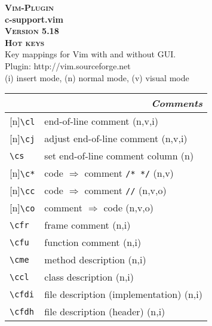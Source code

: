 \documentclass[oneside,11pt,landscape,DIV17]{scrartcl}
\newcommand{\Pluginversion}{5.18}
\newcommand{\Rep}{{\tiny{[n]}}}
\begin{document}
%

\begin{multicols}{3}
%
\begin{center}
\textbf{\textsc{\small{Vim-Plugin}}}\\
\textbf{\LARGE{c-support.vim}}\\
\textbf{\textsc{\small{Version \Pluginversion}}}\\
\textbf{\textsc{\Huge{Hot keys}}}\\
Key mappings for Vim with and without GUI.\\
Plugin: http://vim.sourceforge.net\\
\vspace{3.0mm}
{\normalsize (i)} insert mode, {\normalsize (n)} normal mode, {\normalsize (v)} visual mode\\
\vspace{5.0mm}
%
\begin{tabular}[]{|p{10mm}|p{60mm}|}
%
\hline
\multicolumn{2}{|r|}{\textsl{\textbf{C}omments}} \\
\hline \Rep\verb'\cl'  & end-of-line comment                     \hfill (n,v,i)\\
\hline \Rep\verb'\cj'  & adjust end-of-line comment              \hfill (n,v,i)\\
\hline     \verb'\cs'  & set end-of-line comment column          \hfill (n)    \\
\hline \Rep\verb'\c*'  & code $\Rightarrow$ comment \verb'/* */' \hfill (n,v)  \\
\hline \Rep\verb'\cc'  & code $\Rightarrow$ comment \verb'//'    \hfill (n,v,o)\\
\hline \Rep\verb'\co'  & comment $\Rightarrow$ code              \hfill (n,v,o)\\

\hline \verb'\cfr' & frame comment                           \hfill (n,i)\\
\hline \verb'\cfu' & function comment                        \hfill (n,i)\\
\hline \verb'\cme' & method description                      \hfill (n,i)\\
\hline \verb'\ccl' & class description                       \hfill (n,i)\\
\hline \verb'\cfdi'& file description (implementation)       \hfill (n,i)\\
\hline \verb'\cfdh'& file description (header)               \hfill (n,i)\\


\end{tabular}
\end{center}
\end{multicols}
\end{document}
